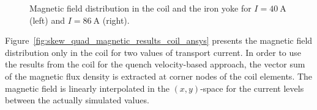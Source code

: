 \begin{figure}[H]
    \centering
    \caption{Magnetic field distribution in the coil and the iron yoke for $I=40~\text{A}$ (left) and $I=86~\text{A}$ (right).}
    \label{fig:skew_quad_magnetic_results_geometry_ansys}
\end{figure}

Figure~\ref{fig:skew_quad_magnetic_results_coil_ansys} presents the magnetic field distribution only in the coil for two values of transport current. In order to use the results from the coil for the quench velocity-based approach, the vector sum of the magnetic flux density is extracted at corner nodes of the coil elements. The magnetic field is linearly interpolated in the $(x,y)$-space for the current levels between the actually simulated values. 

